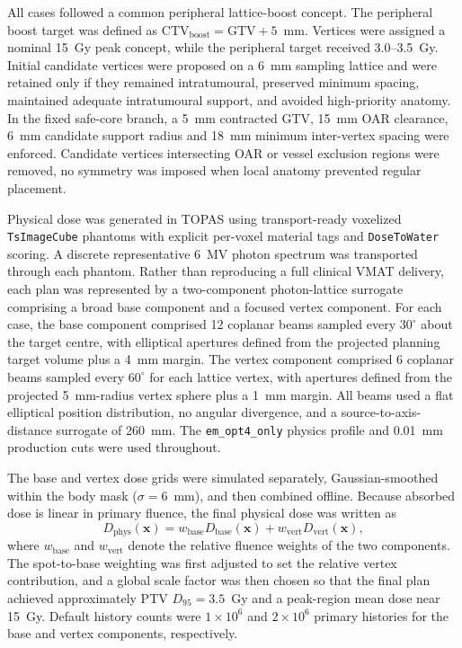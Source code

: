 \documentclass[10pt,a4paper]{article}
\newcommand{\Dphys}{D_{\mathrm{phys}}}
\newcommand{\CTVboost}{\mathrm{CTV}_{\mathrm{boost}}}
\begin{document}
All cases followed a common peripheral lattice-boost concept. The peripheral boost target was defined as $\CTVboost=\mathrm{GTV}+5$~mm. Vertices were assigned a nominal 15~Gy peak concept, while the peripheral target received 3.0--3.5~Gy. Initial candidate vertices were proposed on a 6~mm sampling lattice and were retained only if they remained intratumoural, preserved minimum spacing, maintained adequate intratumoural support, and avoided high-priority anatomy. In the fixed safe-core branch, a 5~mm contracted GTV, 15~mm OAR clearance, 6~mm candidate support radius and 18~mm minimum inter-vertex spacing were enforced. Candidate vertices intersecting OAR or vessel exclusion regions were removed, no symmetry was imposed when local anatomy prevented regular placement.

Physical dose was generated in TOPAS using transport-ready voxelized \texttt{TsImageCube} phantoms with explicit per-voxel material tags and \texttt{DoseToWater} scoring. A discrete representative 6~MV photon spectrum was transported through each phantom. Rather than reproducing a full clinical VMAT delivery, each plan was represented by a two-component photon-lattice surrogate comprising a broad base component and a focused vertex component. For each case, the base component comprised 12 coplanar beams sampled every $30^\circ$ about the target centre, with elliptical apertures defined from the projected planning target volume plus a 4~mm margin. The vertex component comprised 6 coplanar beams sampled every $60^\circ$ for each lattice vertex, with apertures defined from the projected 5~mm-radius vertex sphere plus a 1~mm margin. All beams used a flat elliptical position distribution, no angular divergence, and a source-to-axis-distance surrogate of 260~mm. The \texttt{em\_opt4\_only} physics profile and 0.01~mm production cuts were used throughout.

The base and vertex dose grids were simulated separately, Gaussian-smoothed within the body mask ($\sigma=6$~mm), and then combined offline. Because absorbed dose is linear in primary fluence, the final physical dose was written as
\begin{equation}
\Dphys(\mathbf{x})=
w_{\mathrm{base}}D_{\mathrm{base}}(\mathbf{x})+
w_{\mathrm{vert}}D_{\mathrm{vert}}(\mathbf{x}),
\end{equation}
where $w_{\mathrm{base}}$ and $w_{\mathrm{vert}}$ denote the relative fluence weights of the two components. The spot-to-base weighting was first adjusted to set the relative vertex contribution, and a global scale factor was then chosen so that the final plan achieved approximately PTV $D_{95}=3.5$~Gy and a peak-region mean dose near 15~Gy. Default history counts were $1\times10^6$ and $2\times10^6$ primary histories for the base and vertex components, respectively.
\end{document}
